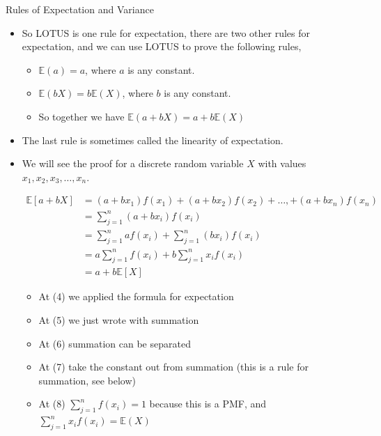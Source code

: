 \documentclass[8pt, usepdftitle=false]{beamer}
\begin{document}
\begin{frame}[allowframebreaks]{Rules of Expectation and Variance}
\begin{itemize}
\begin{itemize}
\item You can create more examples, but application of LOTUS is easy!
\end{itemize}

\item So LOTUS is one rule for expectation, there are two other rules for expectation, and we can use LOTUS to prove the following rules,

\begin{itemize}
\item $\mathbb{E}(a) = a$, where $a$ is any constant.
\item $\mathbb{E}(bX) = b \mathbb{E}(X)$, where $b$ is any constant.
\item So together we have $\mathbb{E}(a + bX) = a + b \mathbb{E}(X)$
\end{itemize}

\item The last rule is sometimes called the \alert{linearity of expectation}.


\item We will see the proof for a discrete random variable $X$ with values $x_1, x_2, x_3, \ldots, x_n$.



\begin{align}
\mathbb{E}[a+b X] &=\left(a+b x_1\right) f(x_1) + \left(a+b x_2\right) f(x_2)+ \ldots, +\left(a+b x_n\right) f(x_n) \\
&=\sum_{j=1}^{n}\left(a+b x_i\right) f(x_i) \\
&=\sum_{j=1}^{n} a  f(x_i) + \sum_{j=1}^{n}\left(b x_i\right) f(x_i) \\
&=a \sum_{j=1}^{n} f(x_i)+b \sum_{j=1}^{n} x_i f(x_i) \\
&=a+b \mathbb{E}[X]
\end{align}

\begin{itemize}

\item At (4) we applied the formula for expectation
\item At (5) we just wrote with summation
\item At (6) summation can be separated
\item At (7) take the constant out from summation (this is a rule for summation, see below)
\item At (8) $\sum_{j=1}^{n} f(x_i) = 1$ because this is a PMF, and $\sum_{j=1}^{n} x_i f(x_i) = \mathbb{E}(X)$

\end{itemize}




\end{itemize}
\end{frame}
\end{document}
